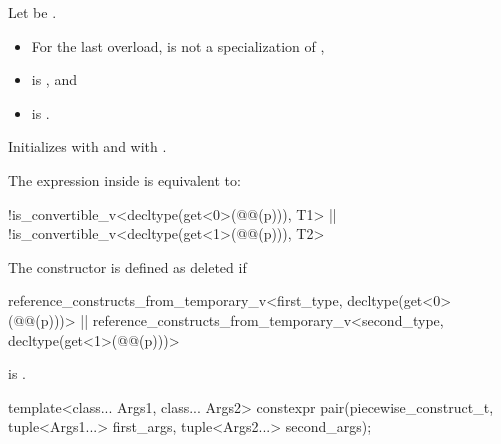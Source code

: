 \begin{itemdescr}
\pnum
Let  be .

\pnum
\constraints
\begin{itemize}
\item
For the last overload,
 is not a specialization of ,
\item
{}
is , and
\item
{}
is .
\end{itemize}

\pnum
\effects
Initializes  with  and
 with .

\pnum
\remarks
The expression inside  is equivalent to:
\begin{codeblock}
!is_convertible_v<decltype(get<0>(@@(p))), T1> ||
!is_convertible_v<decltype(get<1>(@@(p))), T2>
\end{codeblock}
The constructor is defined as deleted if
\begin{codeblock}
reference_constructs_from_temporary_v<first_type, decltype(get<0>(@@(p)))> ||
reference_constructs_from_temporary_v<second_type, decltype(get<1>(@@(p)))>
\end{codeblock}
is .
\end{itemdescr}

%
\begin{itemdecl}
template<class... Args1, class... Args2>
  constexpr pair(piecewise_construct_t,
                 tuple<Args1...> first_args, tuple<Args2...> second_args);
\end{itemdecl}


